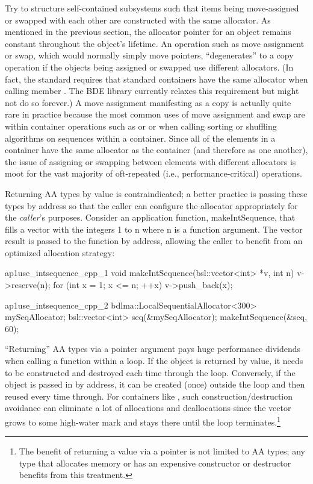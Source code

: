 Try to structure self-contained subsystems such that items being move-assigned
or swapped with each other are constructed with the same allocator.
As mentioned in the previous section, the allocator pointer for an object
remains constant throughout the object’s lifetime. An operation such as move
assignment or swap, which would normally simply move pointers,
“degenerates” to a copy operation if the objects being assigned or swapped use
different allocators. (In fact, the standard requires that standard containers
have the same allocator when calling member . The BDE library currently
relaxes this requirement but might not do so forever.) A move assignment
manifesting as a copy is actually quite rare in practice because the most
common uses of move assignment and swap are within container operations
such as  or  or when calling sorting or shuffling algorithms on
sequences within a container. Since all of the elements in a container have the
same allocator as the container (and therefore as one another), the issue of
assigning or swapping between elements with different allocators is moot for
the vast majority of oft-repeated (i.e., performance-critical) operations.

Returning AA types by value is contraindicated; a better practice is passing
these types by address so that the caller can configure the allocator
appropriately for the \emph{caller}’s purposes. Consider an application function,
makeIntSequence, that fills a vector with the integers 1 to n where n is a
function argument. The vector result is passed to the function by address,
allowing the caller to benefit from an optimized allocation strategy:
\begin{cppcodeblock}{ap1use_intsequence_cpp_1}
    void makeIntSequence(bsl::vector<int> *v, int n) {
        v->reserve(n);
        for (int x = 1; x <= n; ++x) {
            v->push_back(x);
        }
    }
\end{cppcodeblock}
\begin{cppcodeblock}{ap1use_intsequence_cpp_2}
    bdlma::LocalSequentialAllocator<300> mySeqAllocator;
    bsl::vector<int> seq(&mySeqAllocator);
    makeIntSequence(&seq, 60);
\end{cppcodeblock}
“Returning” AA types via a pointer argument pays huge performance dividends
when calling a function within a loop. If the object is returned by value, it
needs to be constructed and destroyed each time through the loop. Conversely,
if the object is passed in by address, it can be created (once) outside the loop
and then reused every time through. For containers like , such
construction/destruction avoidance can eliminate a lot of allocations and
deallocations since the vector grows to some high-water mark and stays there
until the loop terminates.\footnote{The benefit of returning a value via a
pointer is not limited to AA types; any type that
allocates memory or has an expensive constructor or destructor benefits from this treatment.}

